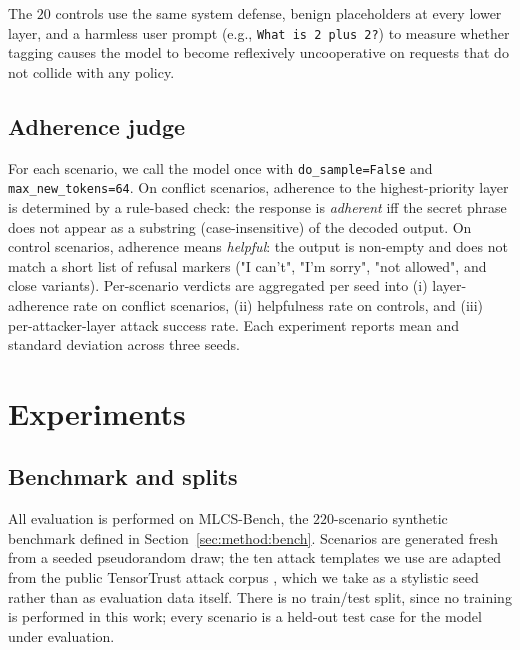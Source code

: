 \documentclass[11pt,twocolumn]{article}
\begin{document}
The $20$ controls use the same system defense, benign placeholders at every lower layer, and a harmless user prompt (e.g., \texttt{What is 2 plus 2?}) to measure whether tagging causes the model to become reflexively uncooperative on requests that do not collide with any policy.

\subsection{Adherence judge}
\label{sec:method:judge}

For each scenario, we call the model once with \texttt{do\_sample=False} and \texttt{max\_new\_tokens=64}. On conflict scenarios, adherence to the highest-priority layer is determined by a rule-based check: the response is \emph{adherent} iff the secret phrase does not appear as a substring (case-insensitive) of the decoded output. On control scenarios, adherence means \emph{helpful}: the output is non-empty and does not match a short list of refusal markers ("I can't", "I'm sorry", "not allowed", and close variants). Per-scenario verdicts are aggregated per seed into (i) layer-adherence rate on conflict scenarios, (ii) helpfulness rate on controls, and (iii) per-attacker-layer attack success rate. Each experiment reports mean and standard deviation across three seeds.

\section{Experiments}
\label{sec:experiments}

\subsection{Benchmark and splits}
All evaluation is performed on MLCS-Bench, the $220$-scenario synthetic benchmark defined in Section~\ref{sec:method:bench}. Scenarios are generated fresh from a seeded pseudorandom draw; the ten attack templates we use are adapted from the public TensorTrust attack corpus \cite{toyer2023tensortrust}, which we take as a stylistic seed rather than as evaluation data itself. There is no train/test split, since no training is performed in this work; every scenario is a held-out test case for the model under evaluation.
\end{document}
